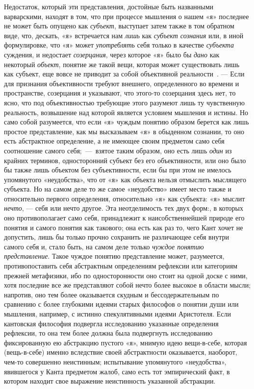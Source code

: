 \documentclass[twoside]{article}
\begin{document}
{Недостаток, который эти представления, достойные быть
названными варварскими, находят в том, что при процессе мышления о нашем
«я» последнее не может быть опущено как
{\em субъект}, выступает
затем также в том обратном виде, что, дескать, «я» встречается нам
{\em лишь} как
{\em субъект сознания}
или, в иной формулировке, что «я» может
{\em употреблять} себя
только в качестве {\em субъекта}
суждения, и недостает
{\em созерцания}, через
которое «я» было бы {\em дано}
как некоторый
{\em объект}, понятие же
такой вещи, которая может существовать лишь как субъект, еще вовсе не
приводит за собой объективной
реальности~\label{bkm:bm98}.
— Если для признания объективности требуют внешнего,
определенного во времени и пространстве, созерцания и указывают, что
этого-то созерцания здесь нет, то ясно, что под объективностью требующие
этого разумеют лишь ту чувственную реальность, возвышение над которой
является условием мышления и истины. Но само собой разумеется, что если «я»
чуждым понятию образом берется как лишь простое представление, как мы
высказываем «я» в обыденном сознании, то оно есть абстрактное определение,
а не имеющее своим предметом само себя соотношение самого
себя;~—~взятое таким образом, оно есть лишь
{\em один} из крайних
терминов, односторонний субъект без его объективности, или оно было бы
также лишь объектом без субъективности, если бы при этом не имелось
упомянутого «неудобства», что от «я» как объекта нельзя отмыслить мыслящего
субъекта. Но на самом деле то же самое «неудобство» имеет место также и
относительно первого определения, относительно «я» как субъекта: «я» мыслит
{\em нечто}, — себя или
нечто другое. Эта неотделимость тех двух форм:, в которых оно
противополагает само себя, принадлежит к наисобственнейшей природе его
понятия и самого понятия как такового; она есть как раз то, чего Кант хочет
не допустить, лишь бы только прочно сохранить не различающее
себя внутри самого себя и, стало быть, на самом деле только
{\em чуждое понятию представление}.
Такое чуждое понятию представление может, разумеется,
противопоставить себя абстрактным определениям рефлексии или категориям
прежней метафизики, ибо по односторонности оно стоит на одной доске с ними,
хотя последние все же представляют собой нечто более высокое в области
мысли; напротив, оно тем более оказывается скудным и бессодержательным по
сравнению с более глубокими идеями старых философов о понятии души или
мышления, например, с истинно спекулятивными идеями Аристотеля. Если
кантовская философия подвергла исследованию указанные определения
рефлексии, то она тем более должна была подвергнуть исследованию
фиксированную ею абстракцию пустого «я», мнимую идею вещи-в-себе, которая
(вещь-в-себе) именно вследствие своей абстрактности оказывается, наоборот,
чем-то совершенно неистинным; испытывание упомянутого «неудобства»,
явившегося у Канта предметом жалоб, само есть тот эмпирический факт, в
котором находит свое выражение неистинность указанной абстракции.

}
\end{document}
